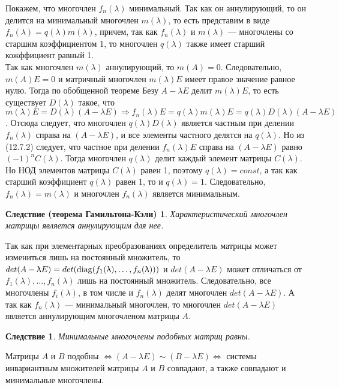 \begin{Proof}
	Покажем, что многочлен $f_n(\lambda)$ минимальный. Так как он аннулирующий, то он делится на минимальный многочлен $m(\lambda)$, то есть представим в виде $f_n(\lambda) = q(\lambda) m(\lambda)$, причем, так как $f_n(\lambda)$ и $m(\lambda)$ --- многочлены со старшим коэффициентом 1, то многочлен $q(\lambda)$ также имеет старший кожффициент равный 1.\\
	Так как многочлен $m(\lambda)$ аннулирующий, то $m(A) = 0$. Следовательно, $m(A)E = 0$ и матричный многочлен $m(\lambda)E$ имеет правое значение равное нулю. Тогда по обобщенной теореме Безу $A-\lambda E$ делит $m(\lambda)E$, то есть существует $D(\lambda)$ такое, что $m(\lambda)E = D(\lambda)(A-\lambda E)\Rightarrow f_n(\lambda) E = q(\lambda) m(\lambda) E =q(\lambda)D(\lambda)(A-\lambda E)$. Отсюда следует, что многочлен $q(\lambda) D(\lambda)$ является частным при делении $f_n(\lambda)$ справа на $(A-\lambda E)$, и все элементы частного делятся на $q(\lambda)$. Но из (12.7.2) следует, что частное при делении $f_n(\lambda)E$ справа на $(A-\lambda E)$ равно $(-1)^nC(\lambda)$. Тогда многочлен $q(\lambda)$ делит каждый элемент матрицы $C(\lambda)$. Но НОД элементов матрицы $C(\lambda)$ равен 1, поэтому $q(\lambda) = const$, а так как старший коэффициент $q(\lambda)$ равен 1, то и $q(\lambda) = 1$. Следовательно, $f_n(\lambda) = m(\lambda)$ и многочлен $f_n(\lambda)$ является минимальным.
\end{Proof}
\newtheorem*{cor12_7_1}{Следствие (теорема Гамильтона-Кэли)}\begin{cor12_7_1}Характеристический многочлен матрицы является аннулирующим для нее.
\end{cor12_7_1}\begin{Proof}
	Так как при элементарных преобразованиях определитель матрицы может измениться лишь на постоянный множитель, то $det(A-\uplambda E) = det(\operatorname{diag} (f_1(\uplambda),\dots, f_n(\uplambda)))$ и $det(A-\lambda E)$ может отличаться от $f_1(\lambda),\dots, f_n(\lambda)$ лишь на постоянный множитель. Следовательно, все многочлены $f_i(\lambda)$, в том числе и $f_n(\lambda)$ делят многочлен $det(A-\lambda E)$. А так как $f_n(\lambda)$ --- минимальный многочлен, то многочлен $det(A-\lambda E)$ является аннулирующим многочленом матрицы $A$.
\end{Proof}
\newtheorem*{cor12_7_2}{Следствие}\begin{cor12_7_2}Минимальные многочлены подобных матриц равны.
\end{cor12_7_2}\begin{Proof}
	Матрицы $A$ и $B$ подобны $\Longleftrightarrow (A - \lambda E) \sim (B - \lambda E) \Longleftrightarrow$ системы инвариантным множителей матрицы $A$ и $B$ совпадают, а также совпадают и минимальные многочлены.
\end{Proof}





